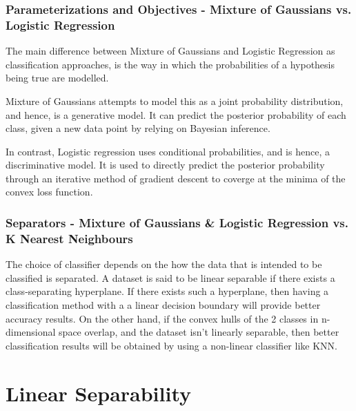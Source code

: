 \documentclass[a4paper]{article}
\begin{document}
\subsubsection*{Parameterizations and Objectives - Mixture of Gaussians vs. Logistic Regression}
The main difference between Mixture of Gaussians and Logistic Regression as classification approaches, is the way in which the probabilities of a hypothesis being true are modelled. 

Mixture of Gaussians attempts to model this as a joint probability distribution, and hence, is a generative model. It can predict the posterior probability of each class, given a new data point by relying on Bayesian inference. 

In contrast, Logistic regression uses conditional probabilities, and is hence, a discriminative model. It is used to directly predict the posterior probability through an iterative method of gradient descent to coverge at the minima of the convex loss function.

\subsubsection*{Separators - Mixture of Gaussians \& Logistic Regression vs. K Nearest Neighbours}
The choice of classifier depends on the how the data that is intended to be classified is separated.
A dataset is said to be linear separable if there exists a class-separating hyperplane. If there exists such a hyperplane, then having a classification method with a a linear decision boundary will provide better accuracy results.
On the other hand, if the convex hulls of the 2 classes in n-dimensional space overlap, and the dataset isn't linearly separable, then better classification results will be obtained by using a non-linear classifier like KNN.

\newpage

\section{Linear Separability}
\end{document}
